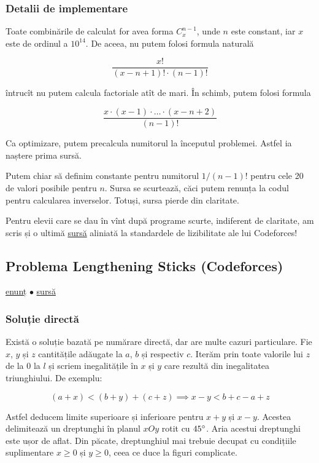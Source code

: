\documentclass[../main.tex]{subfiles}
\begin{document}
\subsubsection*{Detalii de implementare}

Toate combinările de calculat for avea forma $C_x^{n-1}$, unde $n$ este constant, iar $x$ este de ordinul a $10^{14}$. De aceea, nu putem folosi formula naturală

$$\frac{x!}{(x - n + 1)! \cdot (n-1)!}$$

întrucît nu putem calcula factoriale atît de mari. În schimb, putem folosi formula

$$\frac{x \cdot (x - 1) \cdot \dots \cdot (x - n + 2)}{(n-1)!}$$

Ca optimizare, putem precalcula numitorul la începutul problemei. Astfel ia naștere prima sursă.

Putem chiar să definim constante pentru numitorul $1/(n-1)!$ pentru cele 20 de valori posibile pentru $n$. Sursa se scurtează, căci putem renunța la codul pentru calcularea inverselor. Totuși, sursa pierde din claritate.

Pentru elevii care se dau în vînt după programe scurte, indiferent de claritate, am scris și o ultimă \href{https://codeforces.com/contest/451/submission/303384615}{sursă} aliniată la standardele de lizibilitate ale lui Codeforces!

\subsection{Problema Lengthening Sticks (Codeforces)}
\label{problem:lengthening-sticks}

\href{https://codeforces.com/contest/571/problem/A}{enunț}
$\bullet$
\hyperref[code:lengthening-sticks]{sursă}

\subsubsection*{Soluție directă}

Există o soluție bazată pe numărare directă, dar are multe cazuri particulare. Fie $x$, $y$ și $z$ cantitățile adăugate la $a$, $b$ și respectiv $c$. Iterăm prin toate valorile lui $z$ de la $0$ la $l$ și scriem inegalitățile în $x$ și $y$ care rezultă din inegalitatea triunghiului. De exemplu:

$$(a + x) < (b + y) + (c + z) \implies x - y < b + c - a + z$$

Astfel deducem limite superioare și inferioare pentru $x+y$ și $x-y$. Acestea delimitează un dreptunghi în planul $xOy$ rotit cu $45\degree$. Aria acestui dreptunghi este ușor de aflat. Din păcate, dreptunghiul mai trebuie decupat cu condițiile suplimentare $x \geq 0$ și $y \geq 0$, ceea ce duce la figuri complicate.
\end{document}
